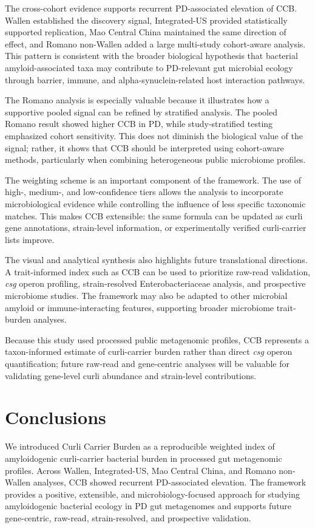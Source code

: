 \documentclass[12pt]{article}
\begin{document}
The cross-cohort evidence supports recurrent PD-associated elevation of CCB. Wallen established the discovery signal, Integrated-US provided statistically supported replication, Mao Central China maintained the same direction of effect, and Romano non-Wallen added a large multi-study cohort-aware analysis. This pattern is consistent with the broader biological hypothesis that bacterial amyloid-associated taxa may contribute to PD-relevant gut microbial ecology through barrier, immune, and alpha-synuclein-related host interaction pathways.

The Romano analysis is especially valuable because it illustrates how a supportive pooled signal can be refined by stratified analysis. The pooled Romano result showed higher CCB in PD, while study-stratified testing emphasized cohort sensitivity. This does not diminish the biological value of the signal; rather, it shows that CCB should be interpreted using cohort-aware methods, particularly when combining heterogeneous public microbiome profiles.

The weighting scheme is an important component of the framework. The use of high-, medium-, and low-confidence tiers allows the analysis to incorporate microbiological evidence while controlling the influence of less specific taxonomic matches. This makes CCB extensible: the same formula can be updated as curli gene annotations, strain-level information, or experimentally verified curli-carrier lists improve.

The visual and analytical synthesis also highlights future translational directions. A trait-informed index such as CCB can be used to prioritize raw-read validation, \textit{csg} operon profiling, strain-resolved Enterobacteriaceae analysis, and prospective microbiome studies. The framework may also be adapted to other microbial amyloid or immune-interacting features, supporting broader microbiome trait-burden analyses.

Because this study used processed public metagenomic profiles, CCB represents a taxon-informed estimate of curli-carrier burden rather than direct \textit{csg} operon quantification; future raw-read and gene-centric analyses will be valuable for validating gene-level curli abundance and strain-level contributions.

\section*{Conclusions}
We introduced Curli Carrier Burden as a reproducible weighted index of amyloidogenic curli-carrier bacterial burden in processed gut metagenomic profiles. Across Wallen, Integrated-US, Mao Central China, and Romano non-Wallen analyses, CCB showed recurrent PD-associated elevation. The framework provides a positive, extensible, and microbiology-focused approach for studying amyloidogenic bacterial ecology in PD gut metagenomes and supports future gene-centric, raw-read, strain-resolved, and prospective validation.
\end{document}
